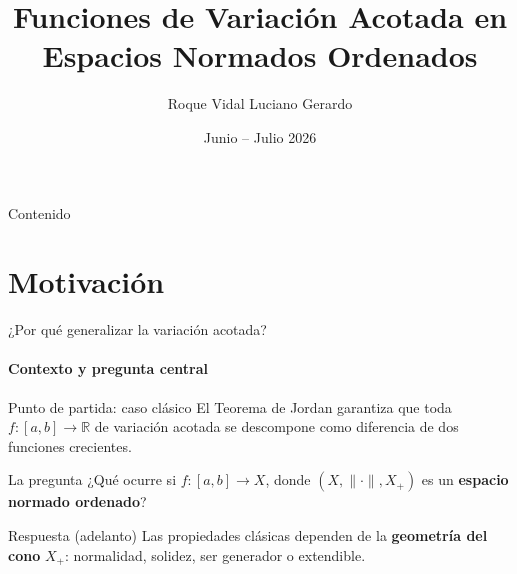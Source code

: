 \documentclass{beamer}
\author{\footnotesize Roque Vidal Luciano Gerardo}
\title{Funciones de Variación Acotada en Espacios Normados Ordenados}
\date{Junio -- Julio 2026}
\newcommand{\Xp}{X_{+}}               %
\begin{document}
\maketitle

\begin{frame}{Contenido}
    \tableofcontents
\end{frame}

\section{Motivación}

\begin{frame}[shrink=20]{¿Por qué generalizar la variación acotada?}
\framesubtitle{Contexto y pregunta central}

\begin{block}{Punto de partida: caso clásico}
{\small El Teorema de Jordan garantiza que toda $f:[a,b]\to\mathbb{R}$ de
variación acotada se descompone como diferencia de dos funciones crecientes.}
\end{block}

\vspace{2pt}

\begin{block}{La pregunta}
{\small ¿Qué ocurre si $f:[a,b]\to X$, donde $(X,\|\cdot\|,\Xp)$ es un
\textbf{espacio normado ordenado}?}
\end{block}

\vspace{2pt}

\begin{alertblock}{Respuesta (adelanto)}
{\small Las propiedades clásicas dependen de la \textbf{geometría del cono} $\Xp$:
normalidad, solidez, ser generador o extendible.}
\end{alertblock}


\end{frame}


\end{document}
